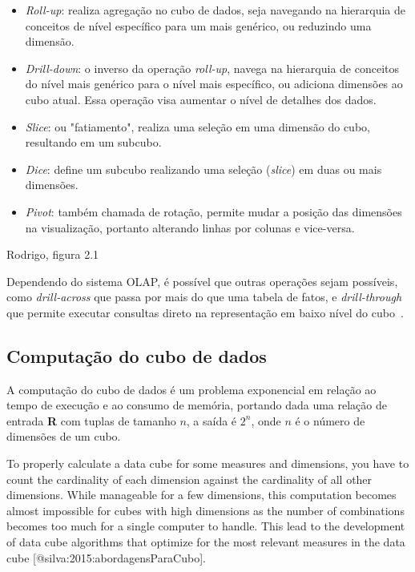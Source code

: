 \begin{itemize}
	\item \textit{Roll-up}: realiza agregação no cubo de dados, seja navegando na hierarquia de conceitos de nível específico para um mais genérico, ou reduzindo uma dimensão.
	\item \textit{Drill-down}: o inverso da operação \textit{roll-up}, navega na hierarquia de conceitos do nível mais genérico para o nível mais específico, ou adiciona dimensões ao cubo atual.
Essa operação visa aumentar o nível de detalhes dos dados.
	\item \textit{Slice}: ou "fatiamento", realiza uma seleção em uma dimensão do cubo, resultando em um subcubo.
	\item \textit{Dice}: define um subcubo realizando uma seleção (\textit{slice}) em duas ou mais dimensões.
	\item \textit{Pivot}: também chamada de rotação, permite mudar a posição das dimensões na visualização, portanto alterando linhas por colunas e vice-versa.
\end{itemize}

{\color{red} Rodrigo, figura 2.1}

Dependendo do sistema OLAP, é possível que outras operações sejam possíveis, como \textit{drill-across} que passa por mais do que uma tabela de fatos, e \textit{drill-through} que permite executar consultas direto na representação em baixo nível do cubo~\cite{hanDataMiningConcepts2011}.

\subsection{Computação do cubo de dados}
\label{ch:fun:cube:comp}

A computação do cubo de dados é um problema exponencial em relação ao tempo de execução e ao consumo de memória, portando dada uma relação de entrada \textbf{R} com tuplas de tamanho $n$, a saída é $2^n$, onde $n$ é o número de dimensões de um cubo.

To properly calculate a data cube for some measures and dimensions, you have to count the cardinality of each dimension against the cardinality of all other dimensions.
While manageable for a few dimensions, this computation becomes almost impossible for cubes with high dimensions as the number of combinations becomes too much for a single computer to handle.
This lead to the development of data cube algorithms that optimize for the most relevant measures in the data cube [@silva:2015:abordagensParaCubo].

